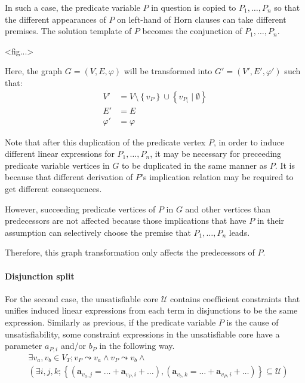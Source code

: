 \documentclass[master,final,12pt]{iscs-thesis}
\begin{document}
In such a case, the predicate variable $P$ in question is copied to
$P_1, \ldots, P_n$ so that the different appearances of $P$ on
left-hand of Horn clauses can take different premises.  The solution
template of $P$ becomes the conjunction of $P_1, \ldots, P_n$.

<fig...>

Here, the graph $G=(V,E,\varphi)$ will be transformed into
$G'=(V',E',\varphi')$ such that:
\begin{align*}
V' & = V \setminus \left\lbrace v_P \right\rbrace \cup
  \left\lbrace v_{P_i} \mid \emptyset \right\rbrace \\
E' & = E \\
\varphi' & = \varphi
\end{align*}

Note that after this duplication of the predicate vertex $P$, in order
to induce different linear expressions for $P_1, \ldots, P_n$, it may
be necessary for preceeding predicate variable vertices in $G$ to be
duplicated in the same manner as $P$. It is because that different
derivation of $P$'s implication relation may be required to get
different consequences.

However, succeeding predicate vertices of $P$ in $G$ and other
vertices than predecessors are not affected because those implications
that have $P$ in their assumption can selectively choose the premise
that $P_1, \ldots, P_n$ leads.

Therefore, this graph transformation only affects the predecessors of
$P$.

\paragraph{Disjunction split}
For the second case, the unsatisfiable core $\mathcal{U}$ contains
coefficient constraints that unifies induced linear expressions from
each term in disjunctions to be the same expression.  Similarly as
previous, if the predicate variable $P$ is the cause of
unsatisfiability, some constraint expressions in the unsatisfiable
core have a parameter $a_{P,i}$ and/or $b_P$ in the following way.
\begin{align*}
& \exists v_a, v_b \in V_T; v_P \leadsto v_a \wedge v_P \leadsto v_b \wedge \\
& \left( \exists i, j, k;
\left\lbrace \left( \mathbf{a}_{v_a,j} = \ldots + \mathbf{a}_{v_P,i} + \ldots \right),
\left( \mathbf{a}_{v_b,k} = \ldots + \mathbf{a}_{v_P,i} + \ldots \right)
\right\rbrace \subseteq \mathcal{U} \right)
\end{align*}
\end{document}
